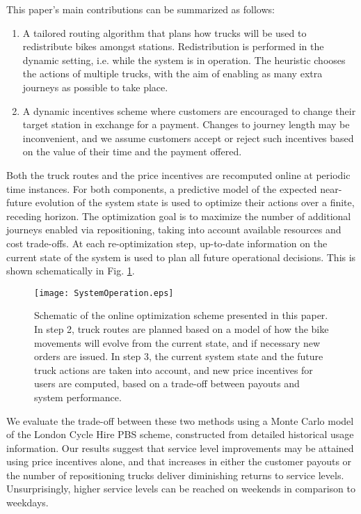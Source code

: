 \documentclass{article}
\begin{document}
This paper's main contributions can be summarized as follows:
\begin{enumerate}
\item A tailored routing algorithm that plans how trucks will be used to
  redistribute bikes amongst stations. Redistribution is performed in the
  dynamic setting, i.e. while the system is in operation. The heuristic
  chooses the actions of multiple trucks, with the aim of enabling as many extra
  journeys as possible to take place.
\item A dynamic incentives scheme where customers are encouraged to change their
  target station in exchange for a payment. Changes to journey length may be
  inconvenient, and we assume customers accept or reject such incentives based
  on the value of their time and the payment offered.
\end{enumerate}
Both the truck routes and the price incentives are recomputed online at periodic
time instances. For both components, a predictive model of the expected
near-future evolution of the system state is used to optimize their actions over
a finite, receding horizon. The optimization goal is to maximize the number of
additional journeys enabled via repositioning, taking into account available
resources and cost trade-offs. At each re-optimization step, up-to-date
information on the current state of the system is used to plan all future
operational decisions. This is shown schematically in Fig. \ref{fig:sysop}.

\begin{figure}
  \centering
  \texttt{[image: SystemOperation.eps]}
  \caption{Schematic of the online optimization scheme presented in this paper.
    In step 2, truck routes are planned based on a model of how the bike
    movements will evolve from the current state, and if necessary new orders
    are issued. In step 3, the current system state and the future truck actions
    are taken into account, and new price incentives for users are computed,
    based on a trade-off between payouts and system performance.}
  \label{fig:sysop}
\end{figure}

We evaluate the trade-off between these two methods using a Monte Carlo model of
the London Cycle Hire PBS scheme, constructed from detailed historical usage
information. Our results suggest that service level improvements may be attained
using price incentives alone, and that increases in either the customer payouts
or the number of repositioning trucks deliver diminishing returns to service
levels. Unsurprisingly, higher service levels can be reached on weekends in
comparison to weekdays.
\end{document}

